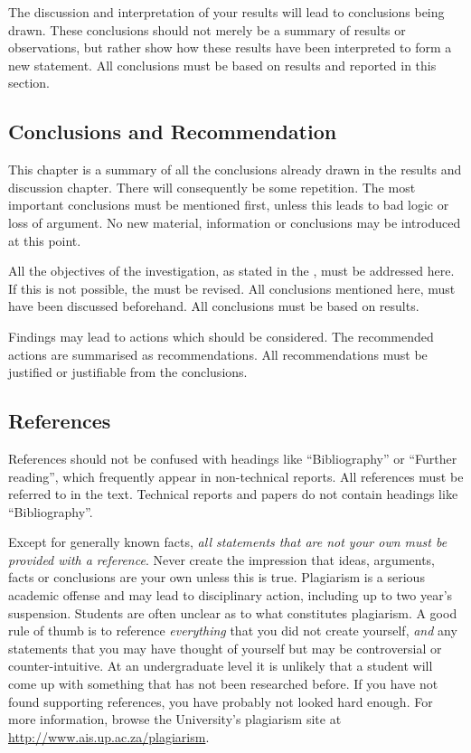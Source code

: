 \documentclass[a5paper, 10pt]{article}
\begin{document}
The discussion and interpretation of your results will lead to
conclusions being drawn.  These conclusions should not merely be a
summary of results or observations, but rather show how these results
have been interpreted to form a new statement.
All conclusions must be based on results and reported in this section.

\subsection{Conclusions and Recommendation}
\label{sec:conclusions-and-recommendations}
This chapter is a summary of all the conclusions already drawn in the results and discussion chapter.
There will consequently be some repetition.
The most important conclusions must be mentioned first, unless this leads
to bad logic or loss of argument.  No new material, information or
conclusions may be introduced at this point.

All the objectives of the investigation, as stated in the
, must be addressed here.  
If this is not possible, the  must be revised.
All conclusions mentioned here, must have been discussed beforehand.  
All conclusions must be based on results.

Findings may lead to actions which should be considered.  The
recommended actions are summarised as recommendations.  All
recommendations must be justified or justifiable from the conclusions.

\subsection{References}
\label{sec:references}
References should not be confused with headings like ``Bibliography''
or ``Further reading'', which frequently appear in non-technical
reports.  All references must be referred to in the text. Technical
reports and papers do not contain headings like ``Bibliography''.

Except for generally known facts, \emph{all statements that are
not your own must be provided with a reference}.  Never create the
impression that ideas, arguments, facts or conclusions are your own
unless this is true.  Plagiarism is a serious academic offense and may lead to disciplinary action, including up to two year's suspension.
Students are often unclear as to what constitutes plagiarism.  A good
rule of thumb is to reference \emph{everything} that you did not
create yourself, \emph{and} any statements that you may have thought
of yourself but may be controversial or counter-intuitive.  At an
undergraduate level it is unlikely that a student will come up with
something that has not been researched before.  If you have not found
supporting references, you have probably not looked hard enough.  For
more information, browse the University's plagiarism site at
\url{http://www.ais.up.ac.za/plagiarism}.
\end{document}
